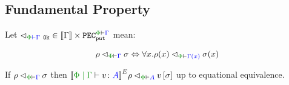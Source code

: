 \documentclass{Report}
\newcommand{\pecputG}[0]{\texttt{PEC}_\put^{\wellformed{\P}{\G}}}
\newcommand\eLogRel[4]{\logRel{#2}{\wellformed{#1}{#3}}{#4}}
\newcommand\peLogRel[3]{\eLogRel{\P}{#1}{#2}{#3}}
\newcommand{\fapply}[0]{^E}
\begin{document}
\subsection{Fundamental Property}\label{FundProp}
Let $\relates_{\wellformedok{\P}{\G}} \in \deno{\G}\times \pecputG$ mean:

\begin{equation}
    \label{LogicalRelationTypeEnvironment}
    \peLogRel{\rho}{\G}{\si} \Leftrightarrow \forall x. \peLogRel{\rho(x)}{\G(x)}{\si(x)}
\end{equation}


\begin{theorem}
    If $\peLogRel{\rho}{\G}{\si}$ then $\peLogRel{\deno{\gpetyperelation{v}{A}}\fapply\rho}{A}{v\ssi}$ up to equational equivalence.    
\end{theorem}
\end{document}
